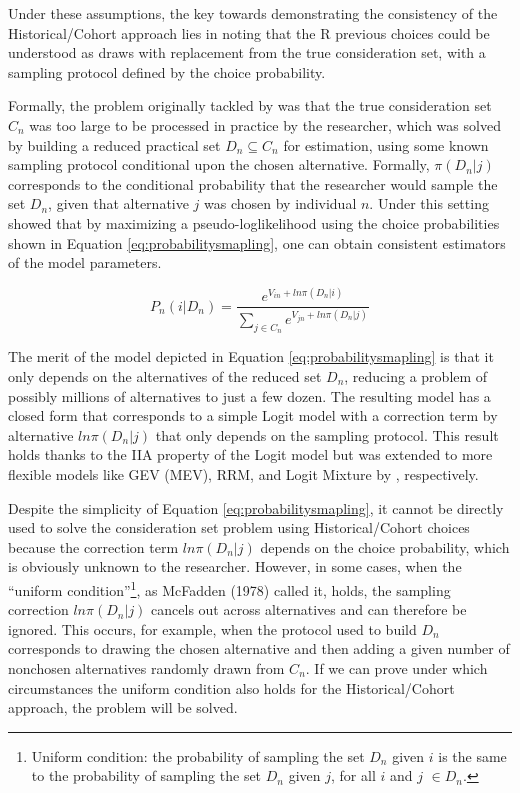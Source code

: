\documentclass[12pt,a4paper]{article}
\begin{document}
Under these assumptions, the key towards demonstrating the consistency of the Historical/Cohort approach lies in noting that the R previous choices could be understood as draws with replacement from the true consideration set, with a sampling protocol defined by the choice probability.

Formally, the problem originally tackled by \cite{mcfadden1978} was that the true consideration set $C_{n}$ was too large to be processed in practice by the researcher, which was solved by building a reduced practical set $D_{n} \subseteq C_{n}$ for estimation, using some known sampling protocol conditional upon the chosen alternative. Formally, $\pi(D_{n} |j)$ corresponds to the conditional probability that the researcher would sample the set $D_{n}$, given that alternative $j$ was chosen by individual $n$. Under this setting \cite{mcfadden1978} showed that by maximizing a pseudo-loglikelihood using the choice probabilities shown in Equation \ref{eq:probabilitysmapling}, one can obtain consistent estimators of the model parameters.

\begin{equation} \label{eq:probabilitysmapling}
P_{n}(i | D_{n}) = \frac{e^{V_{in} + ln{\pi(D_{n}|i)}}}{\sum_{j \in C_{n}}{e^{V_{jn} + ln{\pi(D_{n}|j)}}}} 
\end{equation}

The merit of the model depicted in Equation \ref{eq:probabilitysmapling} is that it only depends on the alternatives of the reduced set $D_{n}$, reducing a problem of possibly millions of alternatives to just a few dozen. The resulting model has a closed form that corresponds to a simple Logit model with a correction term by alternative $ln\pi(D_{n} |j)$ that only depends on the sampling protocol. This result holds thanks to the IIA property of the Logit model but was extended to more flexible models like GEV (MEV), RRM, and Logit Mixture by \cite{guevara2016sampling, guevara2013samplinga, guevara2013samplingb}, respectively. 

Despite the simplicity of Equation \ref{eq:probabilitysmapling}, it cannot be directly used to solve the consideration set problem using Historical/Cohort choices because the correction term $ln\pi(D_{n} |j)$ depends on the choice probability, which is obviously unknown to the researcher. However, in some cases, when the “uniform condition”\footnote{Uniform condition: the probability of sampling the set $D_{n}$ given $i$ is the same to the probability of sampling the set $D_{n}$ given $j$, for all $i$ and $j$ $\in D_{n}$.}, as McFadden (1978) called it, holds, the sampling correction $ln\pi(D_{n} |j)$ cancels out across alternatives and can therefore be ignored. This occurs, for example, when the protocol used to build $D_{n}$ corresponds to drawing the chosen alternative and then adding a given number of nonchosen alternatives randomly drawn from $C_{n}$. If we can prove under which circumstances the uniform condition also holds for the Historical/Cohort approach, the problem will be solved. 
\end{document}
